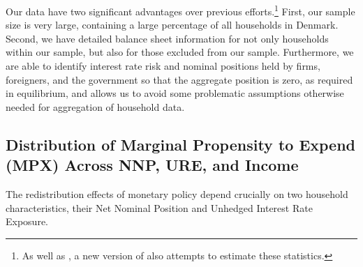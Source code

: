 \documentclass[titlepage]{\econtex}\newcommand{\texname}{ConsumptionHeterogeneity}
\begin{document}
Our data have two significant advantages over previous efforts.\footnote{As well as \cite{auclert_monetary_2017}, a new version of \cite{fagereng_mpc_2016} also attempts to estimate these statistics.} First, our sample size is very large, containing a large percentage of all households in Denmark. Second, we have detailed balance sheet information for not only households within our sample, but also for those excluded from our sample. Furthermore, we are able to identify interest rate risk and nominal positions held by firms, foreigners, and the government so that the aggregate position is zero, as required in equilibrium, and allows us to avoid some problematic assumptions otherwise needed for aggregation of household data.

\subsection{Distribution of Marginal Propensity to Expend (MPX) Across NNP, URE, and Income}
The redistribution effects of monetary policy depend crucially on two household characteristics, their Net Nominal Position and Unhedged Interest Rate Exposure.
\end{document}
